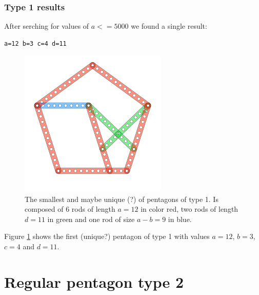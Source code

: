 \documentclass[11pt]{article}
\begin{document}
\subsubsection{Type 1 results}
After serching for values of $a <= 5000$ we found a single result:

\begin{lstlisting}
a=12 b=3 c=4 d=11
\end{lstlisting}

\begin{figure}
\centering
\includegraphics[width=7cm]{figs/pentagon-12a}
\caption{The smallest and maybe unique (?) of pentagons of type 1.
Is composed of 6 rods of length $a = 12$ in color red,
two rods of length $d=11$ in green and one rod of size $a-b = 9$ in blue.}
\label{pentagon-12a}
\end{figure}

Figure \ref{pentagon-12a} shows the first (unique?) pentagon of type 1 with values
$a=12$, $b=3$, $c=4$ and $d=11$.


\section{Regular pentagon type 2}
\end{document}
